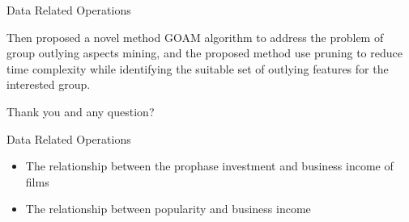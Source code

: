 \documentclass[
 size=14pt,
 paper=smartboard,  %
 mode=present, 		%
 display=slides, 	%
 style=tuliplab,  	%
 pauseslide,
 fleqn,leqno]{powerdot}
\begin{document}
\begin{slide}[toc=,bm=]{ Data Related Operations}
\begin{note}
  Then proposed a novel method GOAM algorithm to address the problem of
  group outlying aspects mining,
  and the proposed method use pruning to reduce time complexity
  while identifying the suitable set of outlying features for the interested group.
  
  Thank you and any question?
  \end{note}
  
  \end{slide}
\begin{slide}[toc=,bm=]{ Data Related Operations}
  \begin{itemize}
  \item The relationship between the prophase investment and business income of films
  
  \item The relationship between popularity and business income
 


\end{itemize}
\end{slide}
\end{document}
